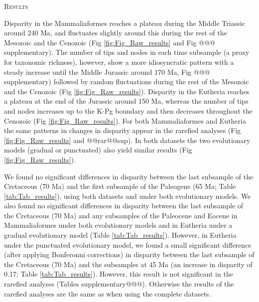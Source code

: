 \documentclass[12pt,letterpaper]{article}
\renewcommand{\section}[1]{%
\bigskip
\begin{center}
\begin{Large}
\normalfont\scshape #1
\medskip
\end{Large}
\end{center}}
\begin{document}
%
%

\section{Results}
Disparity in the Mammaliaformes reaches a plateau during the Middle Triassic around 240 Ma, and fluctuates slightly around this during the rest of the Mesozoic and the Cenozoic (Fig \ref{fig:Fig_Raw_results} and Fig @@@ supplementary).
The number of tips and nodes in each time subsample (a proxy for taxonomic richness), however, show a more idiosyncratic pattern with a steady increase until the Middle Jurassic around 170 Ma, Fig @@@ supplementary) followed by random fluctuations during the rest of the Mesozoic and the Cenozoic (Fig \ref{fig:Fig_Raw_results}).
Disparity in the Eutheria reaches a plateau at the end of the Jurassic around 150 Ma, whereas the number of tips and nodes increases up to the K-Pg boundary and then decreases throughout the Cenozoic (Fig \ref{fig:Fig_Raw_results}).
For both Mammaliaformes and Eutheria the same patterns in changes in disparity appear in the rarefied analyses (Fig \ref{fig:Fig_Raw_results} and @@rar@@sup).
In both datasets the two evolutionary models (gradual or punctuated) also yield similar results (Fig \ref{fig:Fig_Raw_results}).

We found no significant differences in disparity between the last subsample of the Cretaceous (70 Ma) and the first subsample of the Paleogene (65 Ma; Table \ref{tab:Tab_results}), using both datasets and under both evolutionary models. 
We also found no significant differences in disparity between the last subsample of the Cretaceous (70 Ma) and any subsamples of the Paleocene and Eocene in Mammaliaformes under both evolutionary models and in Eutheria under a gradual evolutionary model (Table \ref{tab:Tab_results}).
However, in Eutheria under the punctuated evolutionary model, we found a small significant difference (after applying Bonferonni corrections) in disparity between the last subsample of the Cretaceous (70 Ma) and the subsamples at 45 Ma (an increase in disparity of 0.17; Table \ref{tab:Tab_results}). %
However, this result is not significant in the rarefied analyses (Tables supplementary@@@). 
Otherwise the results of the rarefied analyses are the same as when using the complete datasets. 
\end{document}
